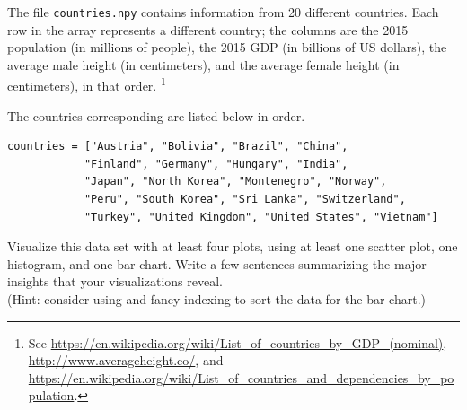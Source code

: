 \begin{problem}
The file \texttt{countries.npy} contains information from 20 different countries.
Each row in the array represents a different country; the columns are the 2015 population (in millions of people), the 2015 GDP (in billions of US dollars), the average male height (in centimeters), and the average female height (in centimeters), in that order.%
\footnote{
See \url{https://en.wikipedia.org/wiki/List_of_countries_by_GDP_(nominal)}, \url{http://www.averageheight.co/}, and \url{https://en.wikipedia.org/wiki/List_of_countries_and_dependencies_by_population}.}

The countries corresponding are listed below in order.

\begin{lstlisting}
countries = ["Austria", "Bolivia", "Brazil", "China",
            "Finland", "Germany", "Hungary", "India",
            "Japan", "North Korea", "Montenegro", "Norway",
            "Peru", "South Korea", "Sri Lanka", "Switzerland",
            "Turkey", "United Kingdom", "United States", "Vietnam"]
\end{lstlisting}

Visualize this data set with at least four plots, using at least one scatter plot, one histogram, and one bar chart.
Write a few sentences summarizing the major insights that your visualizations reveal.
\\(Hint: consider using  and fancy indexing to sort the data for the bar chart.)
\end{problem}


